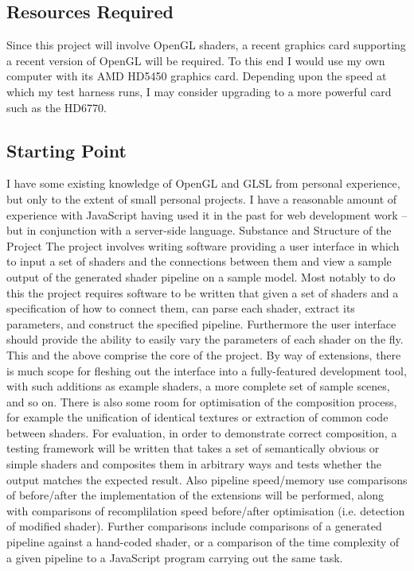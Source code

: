 \subsection*{Resources Required}
Since this project will involve OpenGL shaders, a recent graphics card supporting a recent version
of OpenGL will be required. To this end I would use my own computer with its AMD HD5450
graphics card. Depending upon the speed at which my test harness runs, I may consider upgrading
to a more powerful card such as the HD6770.

\subsection*{Starting Point}
I have some existing knowledge of OpenGL and GLSL from personal experience, but only to the
extent of small personal projects. I have a reasonable amount of experience with JavaScript having
used it in the past for web development work – but in conjunction with a server-side language.
Substance and Structure of the Project
The project involves writing software providing a user interface in which to input a set of shaders
and the connections between them and view a sample output of the generated shader pipeline on a
sample model.
Most notably to do this the project requires software to be written that given a set of shaders and a
specification of how to connect them, can parse each shader, extract its parameters, and construct
the specified pipeline.
Furthermore the user interface should provide the ability to easily vary the parameters of each
shader on the fly. This and the above comprise the core of the project.
By way of extensions, there is much scope for fleshing out the interface into a fully-featured
development tool, with such additions as example shaders, a more complete set of sample scenes,
and so on. There is also some room for optimisation of the composition process, for example the
unification of identical textures or extraction of common code between shaders.
For evaluation, in order to demonstrate correct composition, a testing framework will be written that
takes a set of semantically obvious or simple shaders and composites them in arbitrary ways and
tests whether the output matches the expected result. Also pipeline speed/memory use comparisons
of before/after the implementation of the extensions will be performed, along with comparisons of
recomplilation speed before/after optimisation (i.e. detection of modified shader). Further
comparisons include comparisons of a generated pipeline against a hand-coded shader, or a
comparison of the time complexity of a given pipeline to a JavaScript program carrying out the
same task.


